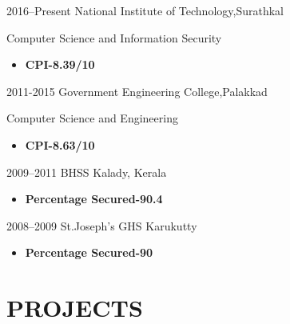 \documentclass[]{cv-style}          %
\begin{document}
\begin{entrylist}
\entry
{2016--Present}   
     { National Institute of Technology,Surathkal}
{}
{

{Computer Science and Information Security}


\begin{itemize}
\item \textbf{CPI-8.39/10}



\end{itemize}}

{\vspace{-0.3cm}}
\end{entrylist}
\begin{entrylist}
\entry
{2011-2015}
{Government Engineering College,Palakkad}
{}
{

{Computer Science and Engineering}

\begin{itemize}
\item \textbf{CPI-8.63/10}



\end{itemize}}

\end{entrylist}
\begin{entrylist}
\entry
{2009--2011}
{BHSS Kalady, Kerala}
{}
{
\begin{itemize}
\item \textbf{Percentage Secured-90.4}
\end{itemize}}

\end{entrylist}

\begin{entrylist}
\entry
{2008--2009}
{St.Joseph's GHS Karukutty}
{}
{
\begin{itemize}
\item \textbf{Percentage Secured-90}
\end{itemize}}

\end{entrylist}


\section{PROJECTS}
\end{document}
